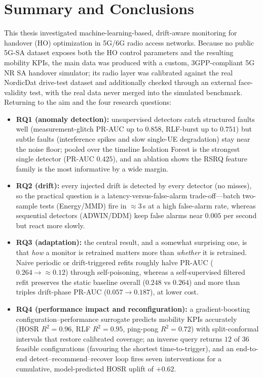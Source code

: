 
\chapter{Summary and Conclusions}
\label{ch:summary}

This thesis investigated machine-learning-based, drift-aware monitoring for
handover (HO) optimization in 5G/6G radio access networks. Because no public
5G-SA dataset exposes both the HO control parameters and the resulting mobility
KPIs, the main data was produced with a custom, 3GPP-compliant 5G NR SA
handover simulator; its radio layer was calibrated against the real NordicDat
drive-test dataset and additionally checked through an external face-validity
test, with the real data never merged into the simulated benchmark. Returning to
the aim and the four research questions:

\begin{itemize}
  \item \textbf{RQ1 (anomaly detection):} unsupervised detectors catch
  structured faults well (measurement-glitch PR-AUC up to $0.858$, RLF-burst up
  to $0.751$) but subtle faults (interference spikes and slow single-UE
  degradation) stay near the noise floor; pooled over the timeline Isolation
  Forest is the strongest single detector (PR-AUC $0.425$), and an ablation shows
  the RSRQ feature family is the most informative by a wide margin.
  \item \textbf{RQ2 (drift):} every injected drift is detected by every detector
  (no misses), so the practical question is a latency-versus-false-alarm
  trade-off---batch two-sample tests (Energy/MMD) fire in $\approx 3$\,s at a
  high false-alarm rate, whereas sequential detectors (ADWIN/DDM) keep false
  alarms near $0.005$ per second but react more slowly.
  \item \textbf{RQ3 (adaptation):} the central result, and a somewhat surprising one,
  is that \emph{how} a monitor is retrained matters more than \emph{whether} it
  is retrained. Naive periodic or drift-triggered refits roughly halve PR-AUC
  ($0.264 \rightarrow \approx 0.12$) through self-poisoning, whereas a
  self-supervised filtered refit preserves the static baseline overall
  ($0.248$ vs $0.264$) and more than triples drift-phase PR-AUC
  ($0.057 \rightarrow 0.187$), at lower cost.
  \item \textbf{RQ4 (performance impact and reconfiguration):} a
  gradient-boosting configuration--performance surrogate predicts mobility KPIs
  accurately (HOSR $R^2 = 0.96$, RLF $R^2 = 0.95$, ping-pong $R^2 = 0.72$) with
  split-conformal intervals that restore calibrated coverage; an inverse query
  returns $12$ of $36$ feasible configurations (favouring the shortest
  time-to-trigger), and an end-to-end detect--recommend--recover loop fires seven
  interventions for a cumulative, model-predicted HOSR uplift of $+0.62$.
\end{itemize}

